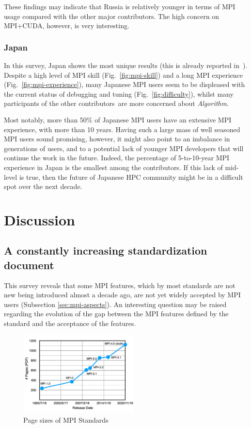 \documentclass[preprint,5p,times]{elsarticle}
\def\myquote#1{{\it #1}}
\def\countries{contributors\xspace{}}%
\def\mcountries{major contributors\xspace{}}%
\begin{document}
These findings may indicate that Russia is relatively younger in terms
of MPI usage compared with the other \mcountries. The high concern on
MPI+CUDA, however, is very interesting.

\subsubsection*{Japan}

In this survey, Japan shows the most unique results (this is already reported
in~\cite{swopp2019}). Despite a high level of MPI skill
(Fig.~\ref{fig:mpi-skill}) and a long MPI experience
(Fig.~\ref{fig:mpi-experience}), many Japanese MPI users seem to be displeased
with the current status of debugging and tuning (Fig.~\ref{fig:difficulty}),
whilst many participants of the other \countries\ are more concerned about
\myquote{Algorithm}.

Most notably, more than 50\% of Japanese MPI users have an extensive MPI
experience, with more than 10 years. Having such a large mass of well seasoned
MPI users sound promising, however, it might also point to an imbalance in
generations of users, and to a potential lack of younger MPI developers that
will continue the work in the future.
Indeed, the percentage of 5-to-10-year MPI experience in Japan is the smallest
among the \countries. If this lack of mid-level is true, then the future of
Japanese HPC community might be in a difficult spot over the next decade.

\section{Discussion}

\subsection{A constantly increasing standardization document}

This survey reveals that some MPI features, which by most standards are not new
being introduced almost a decade ago, are not yet widely accepted by MPI users
(Subsection \ref{sec:mpi-aspects}). An interesting question may be raised
regarding the evolution of the gap between the MPI features defined by the
standard and the acceptance of the features.

\begin{figure}[htb]
\begin{center}
\includegraphics[width=6cm]{Figs/MPI-Standards.pdf}
\caption{Page sizes of MPI Standards}
\label{fig:mpi-standards}
\end{center}
\end{figure}
\end{document}
